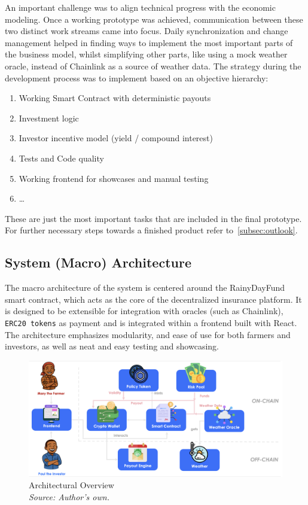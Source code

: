 \documentclass[11pt,a4paper]{article}
\begin{document}
	An important challenge was to align technical progress with the economic modeling.
	Once a working prototype was achieved, communication between these two distinct work streams came into focus.
	Daily synchronization and change management helped in finding ways to implement the most important parts of the business model, whilst simplifying other parts, like using a mock weather oracle, instead of Chainlink as a source of weather data.
	The strategy during the development process was to implement based on an objective hierarchy:

	\begin{enumerate}[1]
		\item Working Smart Contract with deterministic payouts
		\item Investment logic
		\item Investor incentive model (yield / compound interest)
		\item Tests and Code quality
		\item Working frontend for showcases and manual testing
		\item \ldots
	\end{enumerate}

	These are just the most important tasks that are included in the final prototype.
	For further necessary steps towards a finished product refer to~\ref{subsec:outlook}.

	\subsection{System (Macro) Architecture}\label{subsec:system-architecture}
	The macro architecture of the system is centered around the RainyDayFund smart contract, which acts as the core of the decentralized insurance platform.
	It is designed to be extensible for integration with oracles (such as Chainlink), \texttt{ERC20 tokens} as payment and is integrated within a frontend built with React.
	The architecture emphasizes modularity, and ease of use for both farmers and investors, as well as neat and easy testing and showcasing.

	\begin{figure}[H]
		\centering
		\includegraphics[scale=0.3]{graphics/Architectural_Overview}
		\caption{Architectural Overview \\ \textit{Source: Author's own.}}
		\label{fig:architecture}
	\end{figure}
\end{document}
